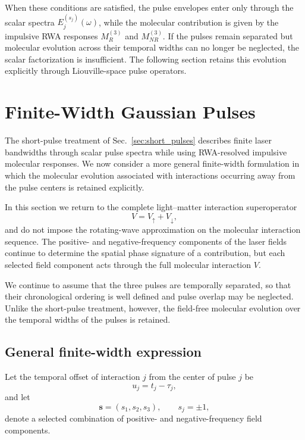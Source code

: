\documentclass[11pt]{article}
\begin{document}
When these conditions are satisfied, the pulse envelopes enter only
through the scalar spectra $E_j^{(s_j)}(\omega)$, while the molecular
contribution is given by the impulsive RWA responses $M_R^{(3)}$ and
$M_{NR}^{(3)}$. If the pulses remain separated but molecular evolution
across their temporal widths can no longer be neglected, the scalar
factorization is insufficient. The following section retains this
evolution explicitly through Liouville-space pulse operators.
\section{Finite-Width Gaussian Pulses}
\label{sec:finite_pulses}

The short-pulse treatment of Sec.~\ref{sec:short_pulses} describes
finite laser bandwidths through scalar pulse spectra while using
RWA-resolved impulsive molecular responses. We now consider a more
general finite-width formulation in which the molecular evolution
associated with interactions occurring away from the pulse centers is
retained explicitly.

In this section we return to the complete light--matter interaction
superoperator
%
\begin{equation}
\boxed{
V
=
V_{\uparrow}
+
V_{\downarrow},
}
\end{equation}
%
and do not impose the rotating-wave approximation on the molecular
interaction sequence. The positive- and negative-frequency components
of the laser fields continue to determine the spatial phase signature
of a contribution, but each selected field component acts through the
full molecular interaction $V$.

We continue to assume that the three pulses are temporally separated,
so that their chronological ordering is well defined and pulse overlap
may be neglected. Unlike the short-pulse treatment, however, the
field-free molecular evolution over the temporal widths of the pulses
is retained.


\subsection{General finite-width expression}
\label{subsec:finite_general}

Let the temporal offset of interaction $j$ from the center of pulse
$j$ be
%
\begin{equation}
u_j=t_j-\tau_j,
\end{equation}
%
and let
%
\begin{equation}
\mathbf{s}
=
(s_1,s_2,s_3),
\qquad
s_j=\pm1,
\end{equation}
%
denote a selected combination of positive- and negative-frequency
field components.
\end{document}
